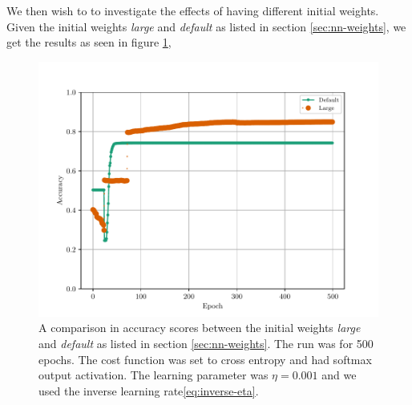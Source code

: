 We then wish to to investigate the effects of having different initial weights. Given the initial weights \textit{large} and \textit{default} as listed in section \ref{sec:nn-weights}, we get the results as seen in figure \ref{fig:mlp-epoch-init-weights},
\begin{figure}[H]
    \centering
    \includegraphics[scale=1.0]{../fig/mlp_epoch_weight_inits.pdf}
    \caption{A comparison in accuracy scores between the initial weights \textit{large} and \textit{default} as listed in section \ref{sec:nn-weights}. The run was for 500 epochs. The cost function was set to cross entropy and had softmax output activation. The learning parameter was $\eta=0.001$ and we used the inverse learning rate\eqref{eq:inverse-eta}.}
    \label{fig:mlp-epoch-init-weights}
\end{figure}


